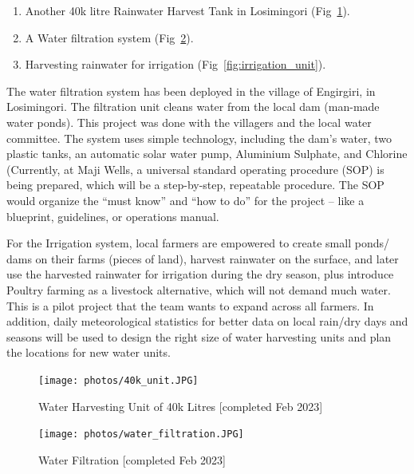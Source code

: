 \documentclass[10pt, twocolumn]{article}
\begin{document}
\begin{enumerate}
    \item Another 40k litre Rainwater Harvest Tank in Losimingori (Fig~\ref{fig:40k_unit}).
    \item A Water filtration system (Fig~\ref{fig:filtration_unit}).
    \item Harvesting rainwater for irrigation (Fig~\ref{fig:irrigation_unit}).
\end{enumerate}

The water filtration system has been deployed in the village of Engirgiri, in Losimingori. The filtration unit cleans water from the local dam (man-made water ponds). This project was done with the villagers and the local water committee. The system uses simple technology, including the dam's water, two plastic tanks, an automatic solar water pump, Aluminium Sulphate, and Chlorine (Currently, at Maji Wells, a universal standard operating procedure (SOP) is being prepared, which will be a step-by-step, repeatable procedure. The SOP would organize the “must know” and “how to do” for the project – like a blueprint, guidelines, or operations manual.

For the Irrigation system, local farmers are empowered to create small ponds/ dams on their farms (pieces of land), harvest rainwater on the surface, and later use the harvested rainwater for irrigation during the dry season, plus introduce Poultry farming as a livestock alternative, which will not demand much water. This is a pilot project that the team wants to expand across all farmers. In addition, daily meteorological statistics for better data on local rain/dry days and seasons will be used to design the right size of water harvesting units and plan the locations for new water units.

\begin{figure}
    \centering
    \texttt{[image: photos/40k\_unit.JPG]}
    \caption{Water Harvesting Unit of 40k Litres [completed Feb 2023]}
    \label{fig:40k_unit}
\end{figure}


\begin{figure}
    \centering
    \texttt{[image: photos/water\_filtration.JPG]}
    \caption{Water Filtration [completed Feb 2023]}
    \label{fig:filtration_unit}
\end{figure}
\end{document}
